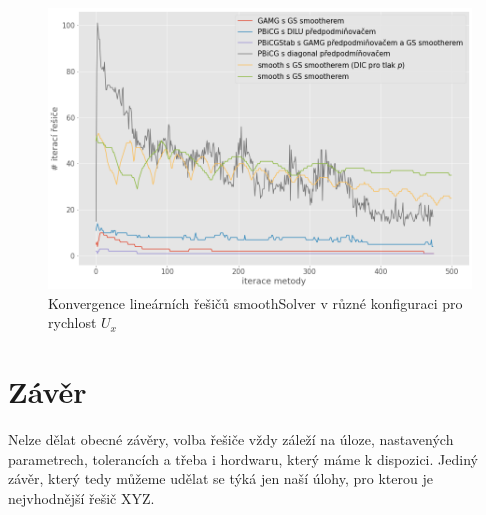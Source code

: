 \documentclass[a4paper,12pt]{report}
\theoremstyle{remark}
\begin{document}
\begin{figure}[H]
	\centering
	\includegraphics[width=1\linewidth]{ux-solver-iters.png}
	\caption{Konvergence lineárních řešičů smoothSolver v různé konfiguraci pro rychlost $U_x$}
	\label{fig:ux-iters}
\end{figure}



{\let\clearpage\relax \chapter{Závěr}}

Nelze dělat obecné závěry, volba řešiče vždy záleží na úloze, nastavených parametrech, tolerancích a třeba i hordwaru, který máme k dispozici. Jediný závěr, který tedy můžeme udělat se týká jen naší úlohy, pro kterou je nejvhodnější řešič XYZ.
\end{document}
